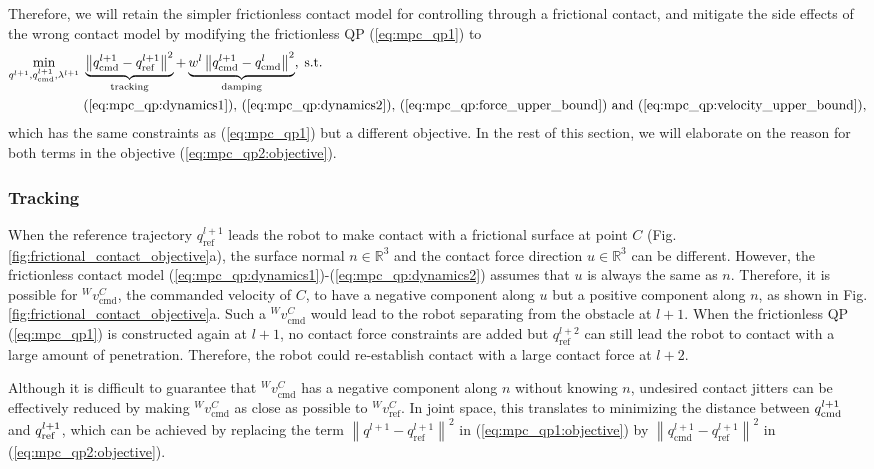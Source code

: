 Therefore, we will retain the simpler frictionless contact model for controlling through a frictional contact, and mitigate the side effects of the wrong contact model by modifying the frictionless QP (\ref{eq:mpc_qp1}) to
\begin{subequations}
\label{eq:mpc_qp2}
\begin{align}
\underset{q^{l+1}, q_{\text{cmd}}^{l+1}, \lambda^{l+1}} {\rm min} \; &\underbrace{\left\|q_\text{cmd}^{l+1} - q_\text{ref}^{l+1}\right\|^2}_{\text{tracking}} + \underbrace{
w^l \left\|q_\text{cmd}^{l+1} - q_\text{cmd}^{l}\right\|^2}_{\text{damping}} \label{eq:mpc_qp2:objective}, \; \text{s.t. } \\
&\text{(\ref{eq:mpc_qp:dynamics1}), (\ref{eq:mpc_qp:dynamics2}), (\ref{eq:mpc_qp:force_upper_bound}) and (\ref{eq:mpc_qp:velocity_upper_bound}),} \nonumber
\end{align}
\end{subequations}
which has the same constraints as (\ref{eq:mpc_qp1}) but a different objective. In the rest of this section, we will elaborate on the reason for both terms in the objective (\ref{eq:mpc_qp2:objective}).

\subsubsection{Tracking}
When the reference trajectory $q_\text{ref}^{l+1}$ leads the robot to make contact with a frictional surface at point $C$ (Fig. \ref{fig:frictional_contact_objective}a), the surface normal $n \in \mathbb{R}^3$ and the contact force direction $u \in \mathbb{R}^3$ can be different. However, the frictionless contact model (\ref{eq:mpc_qp:dynamics1})-(\ref{eq:mpc_qp:dynamics2}) assumes that $u$ is always the same as $n$. Therefore, it is possible for ${}^W v^C_\text{cmd}$, the commanded velocity of $C$, to have a negative component along $u$ but a positive component along $n$, as shown in Fig. \ref{fig:frictional_contact_objective}a. Such a ${}^W v^C_\text{cmd}$ would lead to the robot separating from the obstacle at $l+1$. When the frictionless QP (\ref{eq:mpc_qp1}) is constructed again at $l+1$, no contact force constraints are added but $q_\text{ref}^{l+2}$ can still lead the robot to contact with a large amount of penetration. Therefore, the robot could re-establish contact with a large contact force at $l+2$.

Although it is difficult to guarantee that ${}^W v^C_\text{cmd}$ has a negative component along $n$ without knowing $n$, undesired contact jitters can be effectively reduced by making ${}^W v^C_\text{cmd}$ as close as possible to ${}^W v^C_\text{ref}$. In joint space, this translates to minimizing the distance between $\qcmd[l+1]$ and $\qref[l+1]$, which can be achieved by replacing the term $\left\|q^{l+1} - q_\text{ref}^{l+1}\right\|^2$ in (\ref{eq:mpc_qp1:objective}) by $\left\|q_\text{cmd}^{l+1} - q_\text{ref}^{l+1}\right\|^2$ in (\ref{eq:mpc_qp2:objective}).

